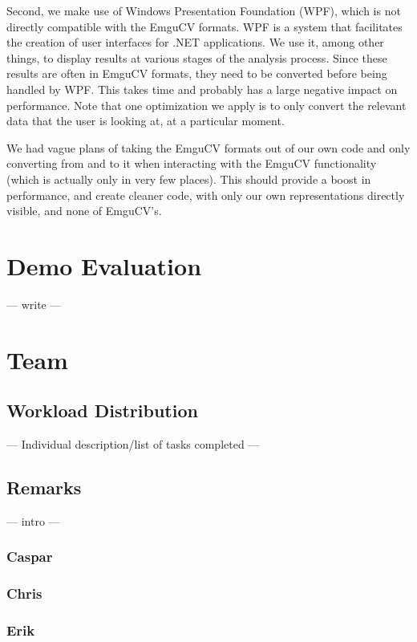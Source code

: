 \documentclass[10pt, abstracton]{scrartcl}
\begin{document}
\begin{appendices}
Second, we make use of Windows Presentation Foundation (WPF), which is not directly compatible with the EmguCV formats. WPF is a system that facilitates the creation of user interfaces for .NET applications. We use it, among other things, to display results at various stages of the analysis process. Since these results are often in EmguCV formats, they need to be converted before being handled by WPF. This takes time and probably has a large negative impact on performance. Note that one optimization we apply is to only convert the relevant data that the user is looking at, at a particular moment.

We had vague plans of taking the EmguCV formats out of our own code and only converting from and to it when interacting with the EmguCV functionality (which is actually only in very few places). This should provide a boost in performance, and create cleaner code, with only our own representations directly visible, and none of EmguCV's.

\section{Demo Evaluation}
---
write
---

\section{Team}
\label{sec:team}

\subsection{Workload Distribution}
---
Individual description/list of tasks completed
---

\subsection{Remarks}
---
intro
---


\subsubsection{Caspar}


\subsubsection{Chris}


\subsubsection{Erik}



\end{appendices}
\end{document}
